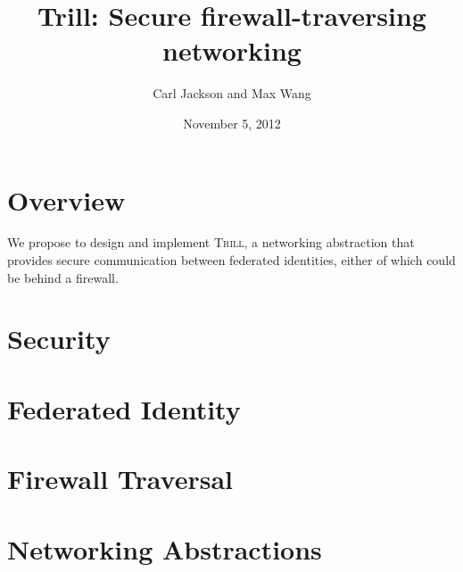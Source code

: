 \documentclass[12pt]{article}
\title{Trill: Secure firewall-traversing networking}
\author{Carl Jackson and Max Wang}
\date{November 5, 2012}
\newcommand{\trill}{\textsc{Trill}\xspace}
\begin{document}
\maketitle

\section*{Overview}
We propose to design and implement \trill, a networking abstraction that
provides secure communication between federated identities, either of which
could be behind a firewall.

\section*{Security}

\section*{Federated Identity}

\section*{Firewall Traversal}

\section*{Networking Abstractions}
\end{document}
